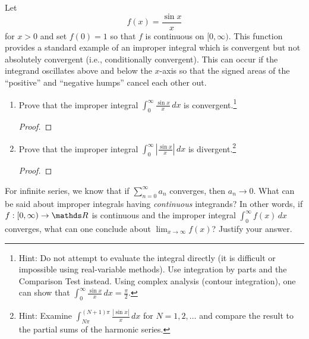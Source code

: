 \documentclass{../homework}
\begin{document}
\begin{Exercise}
	Let $$f(x) = \displaystyle\frac{\sin x}{x}$$ for $x > 0$ and set
  $f(0) = 1$ so that $f$ is continuous on $[0,\infty)$.  This function
  provides a standard example of an improper integral which is
  convergent but not absolutely convergent (i.e., conditionally
  convergent). This can occur if the integrand oscillates above and
  below the $x$-axis so that the signed areas of the ``positive'' and
  ``negative humps'' cancel each other out.
	\begin{enumerate}
  \item Prove that the improper integral
    $\displaystyle \int_0^{\infty} \frac{\sin x}{x}\,dx$ is
    convergent.\footnote{Hint: Do not attempt to evaluate the integral
      directly (it is difficult or impossible using real-variable
      methods).  Use integration by parts and the Comparison Test
      instead.  Using complex analysis (contour integration), one can
      show that
      $\int_0^{\infty} \frac{\sin x}{x}\,dx = \frac{\pi}{2}$.}

    \begin{solution}
      \begin{proof}

      \end{proof}
    \end{solution}

  \item Prove that the improper integral
    $\displaystyle \int_0^{\infty} \left| \frac{\sin x}{x}
    \right|\,dx$ is divergent.\footnote{Hint: Examine
      $\int_{N\pi}^{(N+1)\pi} \frac{ |\sin x|}{x} \,dx$ for
      $N = 1,2,\ldots$ and compare the result to the partial sums of
      the harmonic series.  }

    \begin{solution}
      \begin{proof}

      \end{proof}
    \end{solution}
	\end{enumerate}
\end{Exercise}

\begin{Exercise}
	For infinite series, we know that if $\sum_{n=0}^{\infty} a_n$
  converges, then $a_n \to 0$.  What can be said about improper
  integrals having \emph{continuous} integrands?  In other words, if
  $f:[0,\infty) \to \R$ is continuous and the improper integral
  $\int_0^{\infty} f(x) \,dx$ converges, what can one conclude about
  $\lim_{x\to\infty} f(x)$?  Justify your answer.

  \begin{solution}

  \end{solution}
\end{Exercise}
\end{document}
